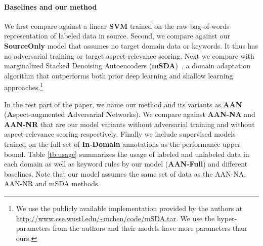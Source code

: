 \paragraph{Baselines and our method} We first compare against a linear \textbf{SVM} trained on the raw bag-of-words representation of labeled data in source. Second, we compare against our \textbf{SourceOnly} model that assumes no target domain data or keywords. It thus has no adversarial training or target aspect-relevance scoring. Next we compare with marginalized Stacked Denoising Autoencoders (\textbf{mSDA})~\cite{chen2012marginalized}, a domain adaptation algorithm that outperforms both prior deep learning and shallow learning approaches.\footnote{We use the publicly available implementation provided by the authors at \url{http://www.cse.wustl.edu/~mchen/code/mSDA.tar}. We use the hyper-parameters from the authors and their models have more parameters than ours.} 

In the rest part of the paper, we name our method and its variants as \textbf{AAN} (\textbf{A}spect-augmented \textbf{A}dversarial \textbf{N}etworks).
We compare against \textbf{AAN-NA} and \textbf{AAN-NR} that are our model variants without adversarial training and without aspect-relevance scoring respectively. Finally we include supervised models trained on the full set of \textbf{In-Domain} annotations as the performance upper bound.
Table \ref{tb:usage} summarizes the usage of labeled and unlabeled data in each domain as well as keyword rules by our model (\textbf{AAN-Full}) and different baselines. Note that our model assumes the same set of data as the AAN-NA, AAN-NR and mSDA methods.







